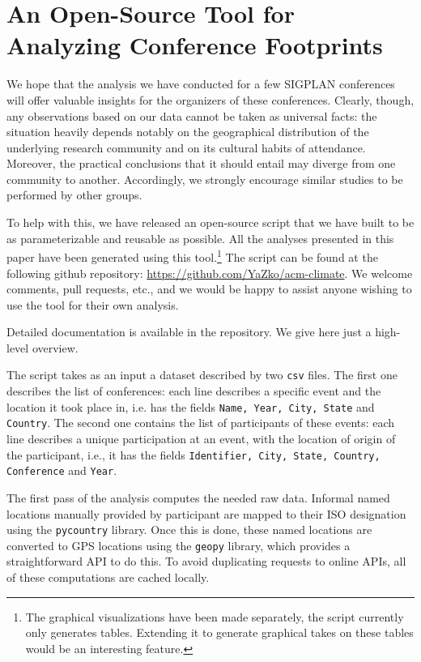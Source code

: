 \section{An Open-Source Tool for Analyzing Conference Footprints}
\label{sec:software}

We hope that the analysis we have conducted for a few SIGPLAN conferences
will offer valuable insights for the organizers of these conferences.
Clearly, though, any observations based on our data cannot be taken as
universal facts: the situation heavily depends notably on the geographical
distribution of the underlying research community and on its cultural habits
of attendance. Moreover, the practical conclusions that it should entail may
diverge from one community to another.  Accordingly, we strongly encourage
similar studies to be performed by other groups.

To help with this, we have released an open-source \python{} script that we
have built to be as parameterizable and reusable as possible. All the
analyses presented in this paper have been generated using this
tool.\footnote{The graphical visualizations have been made separately, the
  script currently only generates tables. Extending it to generate graphical
  takes on these tables would be an interesting feature.} The script can be
found at the following github repository:
\url{https://github.com/YaZko/acm-climate}.
%
We welcome comments, pull requests, etc., and we would be happy to assist
anyone wishing to use the tool for their own analysis.

Detailed documentation is available in the repository. We give here just a
high-level overview.

The script takes as an input a dataset described by two \texttt{csv}
files. The first one describes the list of conferences: each line describes
a specific event and the location it took place in, i.e. has the fields
\texttt{Name, Year, City, State} and \texttt{Country}. The second one
contains the list of participants of these events: each line describes a
unique participation at an event, with the location of origin of the
participant, i.e., it  has the fields \texttt{Identifier, City, State, Country,
  Conference} and \texttt{Year}.

The first pass of the analysis computes the needed raw data.  Informal named
locations manually provided by participant are mapped to their ISO
designation using the \texttt{pycountry} library.  Once this is done, these
named locations are converted to GPS locations using the \texttt{geopy}
library, which provides a straightforward API to do this.  To avoid
duplicating requests to online APIs, all of these computations are cached
locally.

